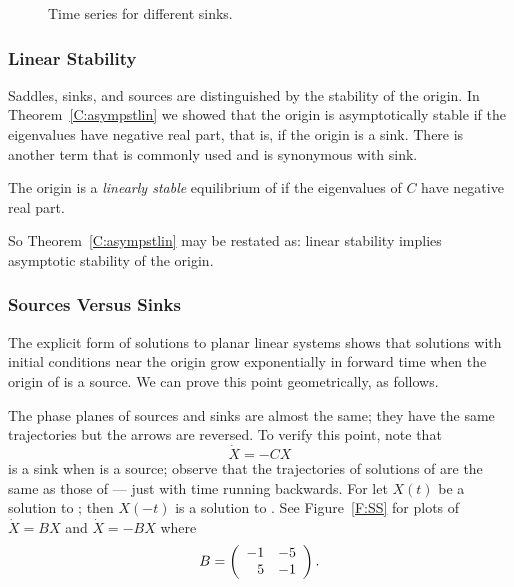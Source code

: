 \documentclass{ximera}
\begin{document}
\begin{figure}[htb]
           \centerline{%
	   }
           \caption{Time series for different sinks.}
           \label{F:oscil}
\end{figure}


\subsubsection*{Linear Stability}

Saddles, sinks, and sources are distinguished by the stability of the
origin.  In Theorem~\ref{C:asympstlin} we showed that the origin is
asymptotically stable if the eigenvalues have negative real part, that is,
if the origin is a sink.  There is another term that is commonly used and
is synonymous with sink.
\begin{Def} \label{D:linstablin}
The origin is a {\em linearly stable\/} equilibrium of  if the
eigenvalues of $C$ have negative real part.
\end{Def}
So Theorem~\ref{C:asympstlin} may be restated as: linear stability
implies asymptotic stability of the origin.

\subsubsection*{Sources Versus Sinks}

The explicit form of solutions to planar linear systems shows that solutions
with initial conditions near the origin grow exponentially in forward time
when the origin of  is a source.  We can prove this point
geometrically, as follows.

The phase planes of sources and sinks are almost the same; they have the
same trajectories but the arrows are reversed.  To verify this point, note
that
\begin{equation}  \label{e:C3}
\dot{X}=-CX
\end{equation}
is a sink when  is a source; observe that the trajectories of
solutions of  are the same as those of  --- just with
time running backwards.  For let $X(t)$ be a solution to ; then
$X(-t)$ is a solution to .   See Figure~\ref{F:SS} for plots of
$\dot{X}=BX$ and $\dot{X}=-BX$ where
\begin{equation}  \label{E:SS}
B = \left(\begin{array}{rr} -1 & -5\\ 5 &-1\end{array}\right).
\end{equation}
\end{document}
